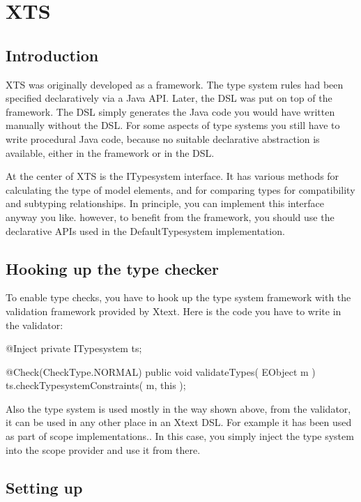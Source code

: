 \section{XTS}

\subsection{Introduction}

XTS was originally developed as a framework. The type system rules  had been
specified declaratively via a Java API. Later, the DSL was put on top of the
framework. The DSL simply generates the Java code you would have written
manually without the DSL. For some aspects of type systems you still have to
write procedural Java code, because no suitable declarative abstraction is
available, either in the framework or in the DSL.

At the center of XTS is the ITypesystem interface. It has various methods for
calculating the type of model elements, and for comparing types for
compatibility and subtyping relationships. In principle, you can implement this
interface anyway you like. however, to benefit from the framework, you should
use the declarative APIs used in the DefaultTypesystem implementation.

\subsection{Hooking up the type checker}

To enable type checks, you have to hook up the type system framework  with the
validation  framework provided by Xtext. Here is the code you have to write in
the validator:

\begin{code}
@Inject 
private ITypesystem ts;

@Check(CheckType.NORMAL)
public void validateTypes( EObject m ) {
    ts.checkTypesystemConstraints( m, this );
}    
\end{code}

Also the type system is used mostly in the way shown above, from the validator,
it can be used in any other place in an Xtext DSL. For example it has been used
as part of scope implementations.. In this case, you simply inject the type
system into the scope provider and use it from there.

\subsection{Setting up}

